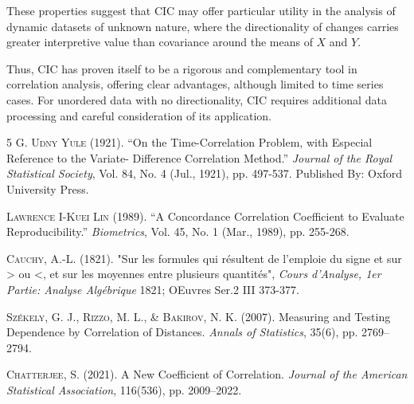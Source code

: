 \documentclass[sts]{imsart}
\newcommand{\cic}{\text{CIC}}
\begin{document}
These properties suggest that $\cic$ may offer particular utility in the analysis of dynamic datasets of unknown nature, where the directionality of changes carries greater interpretive value than covariance around the means of $X$ and $Y$.

Thus, $\cic$ has proven itself to be a rigorous and complementary tool in correlation analysis, offering clear advantages, although limited to time series cases. For unordered data with no directionality, $\cic$ requires additional data processing and careful consideration of its application.


\begin{thebibliography}{5}
\textsc{G. Udny Yule} (1921). “On the Time-Correlation Problem, with Especial Reference to the Variate- Difference Correlation Method.” \textit{Journal of the Royal Statistical Society}, Vol. 84, No. 4 (Jul., 1921), pp. 497-537. Published By: Oxford University Press.

\textsc{Lawrence I-Kuei Lin} (1989). “A Concordance Correlation Coefficient to Evaluate Reproducibility.” \textit{Biometrics}, Vol. 45, No. 1 (Mar., 1989), pp. 255-268.

\textsc{Cauchy, A.-L.} (1821). "Sur les formules qui résultent de l'emploie du signe et sur > ou <, et sur les moyennes entre plusieurs quantités", \textit{Cours d'Analyse, 1er Partie: Analyse Algébrique} 1821; OEuvres Ser.2 III 373-377.

\textsc{Székely, G. J., Rizzo, M. L., \& Bakirov, N. K.} (2007). Measuring and Testing Dependence by Correlation of Distances. \textit{Annals of Statistics}, 35(6), pp. 2769–2794.

\textsc{Chatterjee, S.} (2021). A New Coefficient of Correlation. \textit{Journal of the American Statistical Association}, 116(536), pp. 2009–2022.
\end{thebibliography}
\end{document}
